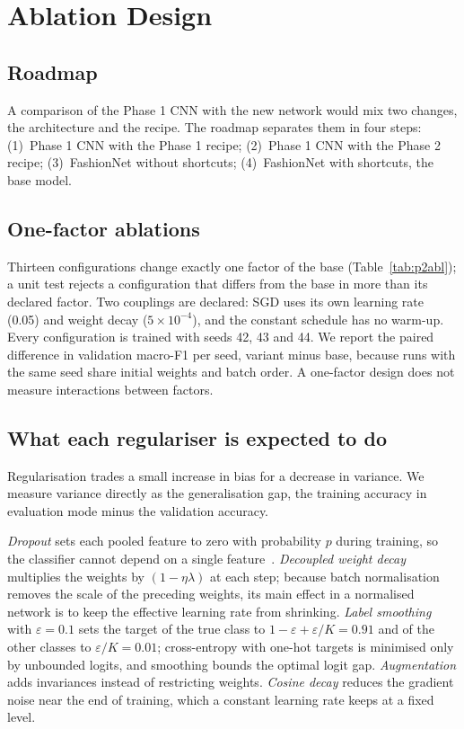 \section{Ablation Design}
\label{sec:p2abl}
\subsection{Roadmap}
A comparison of the Phase 1 CNN with the new network would mix two changes, the architecture and the recipe. The
roadmap separates them in four steps: (1)~Phase 1 CNN with the Phase 1 recipe; (2)~Phase 1 CNN with the Phase 2
recipe; (3)~FashionNet without shortcuts; (4)~FashionNet with shortcuts, the base model.

\subsection{One-factor ablations}
Thirteen configurations change exactly one factor of the base (Table~\ref{tab:p2abl}); a unit test rejects a
configuration that differs from the base in more than its declared factor. Two couplings are declared: SGD uses its
own learning rate (0.05) and weight decay ($5\times10^{-4}$), and the constant schedule has no warm-up. Every
configuration is trained with seeds 42, 43 and 44. We report the paired difference in validation macro-F1 per
seed, variant minus base, because runs with the same seed share initial weights and batch order. A one-factor
design does not measure interactions between factors.

\subsection{What each regulariser is expected to do}
Regularisation trades a small increase in bias for a decrease in variance. We measure variance directly as the
generalisation gap, the training accuracy in evaluation mode minus the validation accuracy.

\emph{Dropout} sets each pooled feature to zero with probability $p$ during training, so the classifier cannot
depend on a single feature~\cite{srivastava2014dropout}. \emph{Decoupled weight decay} multiplies the weights by
$(1-\eta\lambda)$ at each step; because batch normalisation removes the scale of the preceding weights, its main
effect in a normalised network is to keep the effective learning rate from shrinking. \emph{Label smoothing} with
$\varepsilon=0.1$ sets the target of the true class to $1-\varepsilon+\varepsilon/K=0.91$ and of the other classes
to $\varepsilon/K=0.01$; cross-entropy with one-hot targets is minimised only by unbounded logits, and smoothing
bounds the optimal logit gap. \emph{Augmentation} adds invariances instead of restricting weights.
\emph{Cosine decay} reduces the gradient noise near the end of training, which a constant learning rate keeps at
a fixed level.
